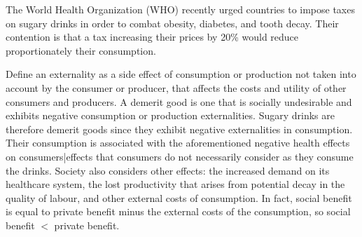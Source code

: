 \documentclass[12pt]{article}
\begin{document}

The World Health Organization (WHO) recently urged countries to impose taxes on sugary drinks in order to combat obesity, diabetes, and tooth decay. Their contention is that a tax increasing their prices by 20\% would reduce proportionately their consumption. 

\vspace{\baselineskip}

Define an externality as a side effect of consumption or production not taken into account by the consumer or producer, that affects the costs and utility of other consumers and producers. A demerit good is one that is socially undesirable and exhibits negative consumption or production externalities. Sugary drinks are therefore demerit goods since they exhibit negative externalities in consumption. Their consumption is associated with the aforementioned negative health effects on consumers|effects that consumers do not necessarily consider as they consume the drinks. Society also considers other effects: the increased demand on its healthcare system, the lost productivity that arises from potential decay in the quality of labour, and other external costs of consumption. In fact, social benefit is equal to private benefit minus the external costs of the consumption, so social benefit $<$ private benefit.

\vspace{\baselineskip}
\end{document}
